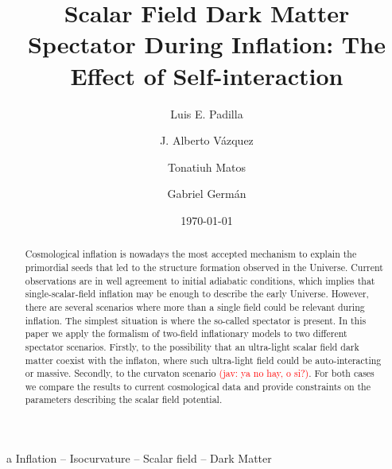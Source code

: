 \documentclass[amssymb,twocolumn,prd,nofootinbib,showpacs]{revtex4-1}
\newcommand{\jav}[1]{\textcolor{red}{(jav: #1)}}
\begin{document}
\title{Scalar Field Dark Matter Spectator During Inflation: The Effect of Self-interaction}
\author{Luis E. Padilla}  
   \author{J. Alberto V\'azquez}  
\author{Tonatiuh Matos}  
   \author{Gabriel Germ\'an}  

\date{\today}

\begin{abstract}
Cosmological inflation is nowadays the most accepted mechanism to explain the  primordial seeds 
that led to  the structure formation observed in the Universe. Current observations are in well agreement 
to initial adiabatic conditions, which implies that  single-scalar-field inflation may be enough to describe 
the early Universe. 
%
However, there are several scenarios where more than a single field could be relevant during inflation. 
The simplest situation is where the so-called spectator is present. 
In this paper we apply the formalism of two-field inflationary models to two different 
spectator scenarios. Firstly, to the possibility that an ultra-light scalar field dark matter coexist with the inflaton, 
where such ultra-light field could be auto-interacting or massive. Secondly, to the curvaton scenario \jav{ya no hay, o si?}.
For both cases we compare the results to current cosmological data and provide constraints on the parameters
describing the scalar field potential.    
\end{abstract}
\begin{keywords}
a Inflation  --  Isocurvature  --  Scalar field -- Dark Matter
\end{keywords}
\end{document}
